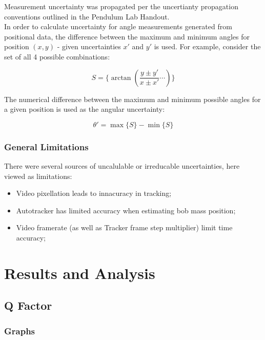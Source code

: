 \documentclass[12pt]{article}
\begin{document}
Measurement uncertainty was propagated per the uncertianty propagation conventions outlined in the Pendulum Lab Handout.\\

In order to calculate uncertainty for angle measurements generated from positional data, the difference between the maximum and minimum angles for position $(x,y)$ - given uncertainties $x'$ and $y'$ is used. For example, consider the set of all 4 possible combinations:

$$ S = \{\arctan(\frac{y\pm y'}{x \pm x'} \cdots)\}$$

The numerical difference between the maximum and minimum possible angles for a given position is used as the angular uncertainty:

$$ \theta' = \max\{S\} - \min\{S\}$$

\subsubsection{General Limitations}
\noindent
There were several sources of uncalulable or irreducable uncertainties, here viewed as limitations:

\begin{itemize}
    \item Video pixellation leads to innacuracy in tracking;
    \item Autotracker has limited accuracy when estimating bob mass position;
    \item Video framerate (as well as Tracker frame step multiplier) limit time accuracy;
\end{itemize}

\newpage

\section{Results and Analysis}

\subsection{Q Factor}
\label{section:q2}
\subsubsection{Graphs}
\end{document}
